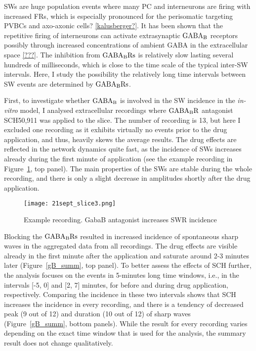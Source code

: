     SWs are huge population events where many PC and interneurons are firing
    with increased FRs, which is especially pronounced for the perisomatic
    targeting PVBCs and axo-axonic cells? \ref{kalusberger?}.  It has been
    shown that the repetitive firing of interneurons can activate extrasynaptic
    $\rm GABA_B$ receptors possibly through increased concentrations of ambient
    GABA in the extracellular space \ref{???}. The inhibition from $\rm GABA_B
    Rs$ is relatively slow lasting several hundreds of milliseconds, which is
    close to the time scale of the typical inter-SW intervals. Here, I study
    the possibility the relatively long time intervals between SW events are
    determined by $\rm GABA_B Rs$.
    
    First, to investigate whether $\rm GABA_B$ is involved in the SW incidence
    in the {\textit{in-vitro}} model, I analysed extracellular recordings where
    $\rm GABA_B R$ antagonist SCH50,911 was applied to the slice. The number of
    recording is 13, but here I excluded one recording as it exhibits virtually
    no events prior to the drug application, and thus, heavily skews the average
    results. The drug effects are reflected in the network dynamics quite fast,
    as the incidence of SWs increases already during the first minute of
    application (see the example recording in Figure~\ref{fig:gB_example}, top
    panel). The main properties of the SWs are stable during the whole
    recording, and there is only a slight decrease in amplitudes shortly
    after the drug application.
    
    \begin{figure}
      \texttt{[image: 21sept\_slice3.png]}
      \caption{ 
        Example recording. GabaB antagonist increases SWR incidence 
              }
    \label{fig:gB_example}
    \end{figure}

    Blocking the $\rm GABA_B Rs$ resulted in increased incidence of spontaneous
    sharp waves in the aggregated data from all recordings. The drug effects
    are visible already in the first minute after the application and saturate
    around 2-3 minutes later (Figure~\ref{gB_summ}, top panel). To better
    assess the effects of SCH further, the analysis focuses on the events in
    5-minutes long time windows, i.e., in the intervals [-5, 0] and [2, 7]
    minutes, for before and during drug application, respectively. Comparing
    the incidence in these two intervals shows that SCH increases the incidence
    in every recording, and there is a tendency of decreased peak (9 out of 12)
    and duration (10 out of 12) of sharp waves (Figure~\ref{gB_summ}, bottom
    panels). While the result for every recording varies depending on the exact
    time window that is used for the analysis, the summary result does not
    change qualitatively.
    
